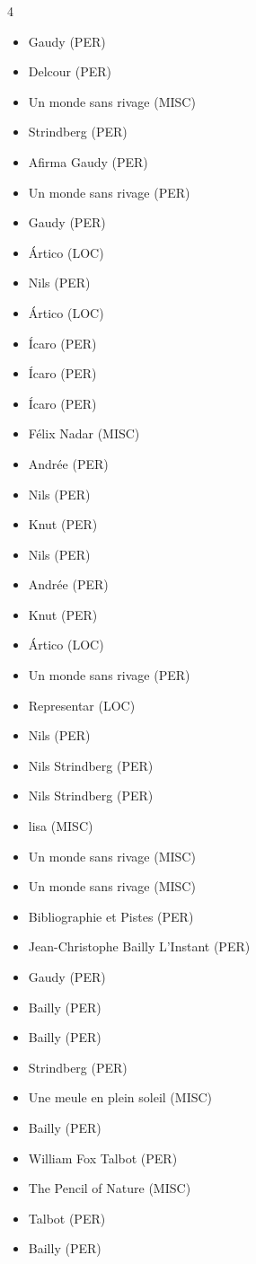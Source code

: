 \documentclass{article}
\begin{document}
\begin{multicols}{4}
\begin{itemize}
\item Gaudy (PER)
\item Delcour (PER)
\item Un monde sans rivage (MISC)
\item Strindberg (PER)
\item Afirma Gaudy (PER)
\item Un monde sans rivage (PER)
\item Gaudy (PER)
\item Ártico (LOC)
\item Nils (PER)
\item Ártico (LOC)
\item Ícaro (PER)
\item Ícaro (PER)
\item Ícaro (PER)
\item Félix Nadar (MISC)
\item Andrée (PER)
\item Nils (PER)
\item Knut (PER)
\item Nils (PER)
\item Andrée (PER)
\item Knut (PER)
\item Ártico (LOC)
\item Un monde sans rivage (PER)
\item Representar (LOC)
\item Nils (PER)
\item Nils Strindberg (PER)
\item Nils Strindberg (PER)
\item lisa (MISC)
\item Un monde sans rivage (MISC)
\item Un monde sans rivage (MISC)
\item Bibliographie et Pistes (PER)
\item Jean-Christophe Bailly L’Instant (PER)
\item Gaudy (PER)
\item Bailly (PER)
\item Bailly (PER)
\item Strindberg (PER)
\item Une meule en plein soleil (MISC)
\item Bailly (PER)
\item William Fox Talbot (PER)
\item The Pencil of Nature (MISC)
\item Talbot (PER)
\item Bailly (PER)

\end{itemize}
\end{multicols}
\end{document}
